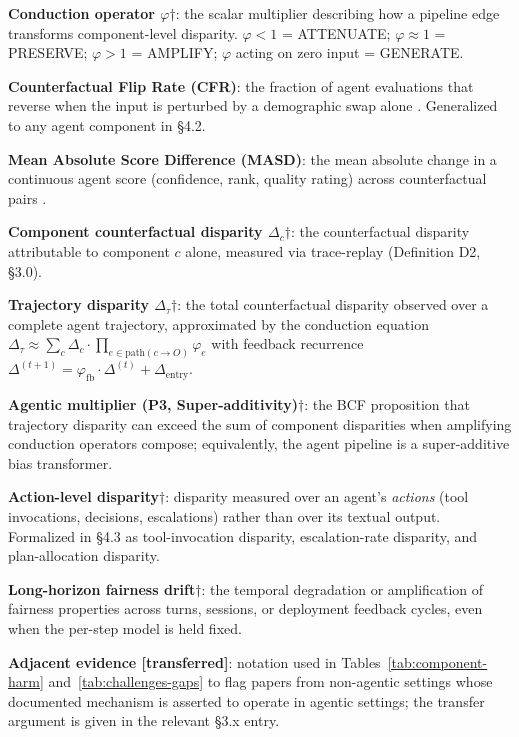 \documentclass[acmsmall,nonacm]{acmart}
\begin{document}
\textbf{Conduction operator $\varphi$$\dagger$}: the scalar multiplier describing how a pipeline edge transforms component-level disparity. $\varphi < 1$ = ATTENUATE; $\varphi \approx 1$ = PRESERVE; $\varphi > 1$ = AMPLIFY; $\varphi$ acting on zero input = GENERATE.

\textbf{Counterfactual Flip Rate (CFR)}: the fraction of agent evaluations that reverse when the input is perturbed by a demographic swap alone \cite{mayilvaghanan2026counterfactual}. Generalized to any agent component in \S{}4.2.

\textbf{Mean Absolute Score Difference (MASD)}: the mean absolute change in a continuous agent score (confidence, rank, quality rating) across counterfactual pairs \cite{mayilvaghanan2026counterfactual}.

\textbf{Component counterfactual disparity $\Delta_c$$\dagger$}: the counterfactual disparity attributable to component $c$ alone, measured via trace-replay (Definition D2, \S{}3.0).

\textbf{Trajectory disparity $\Delta_\tau$$\dagger$}: the total counterfactual disparity observed over a complete agent trajectory, approximated by the conduction equation $\Delta_\tau \approx \sum_c \Delta_c \cdot \prod_{e \in \mathrm{path}(c \to O)} \varphi_e$ with feedback recurrence $\Delta^{(t+1)} = \varphi_{\mathrm{fb}} \cdot \Delta^{(t)} + \Delta_{\mathrm{entry}}$.

\textbf{Agentic multiplier (P3, Super-additivity)$\dagger$}: the BCF proposition that trajectory disparity can exceed the sum of component disparities when amplifying conduction operators compose; equivalently, the agent pipeline is a super-additive bias transformer.

\textbf{Action-level disparity$\dagger$}: disparity measured over an agent's \emph{actions} (tool invocations, decisions, escalations) rather than over its textual output. Formalized in \S{}4.3 as tool-invocation disparity, escalation-rate disparity, and plan-allocation disparity.

\textbf{Long-horizon fairness drift$\dagger$}: the temporal degradation or amplification of fairness properties across turns, sessions, or deployment feedback cycles, even when the per-step model is held fixed.

\textbf{Adjacent evidence [transferred]}: notation used in Tables~\ref{tab:component-harm} and~\ref{tab:challenges-gaps} to flag papers from non-agentic settings whose documented mechanism is asserted to operate in agentic settings; the transfer argument is given in the relevant \S{}3.x entry.
\end{document}
